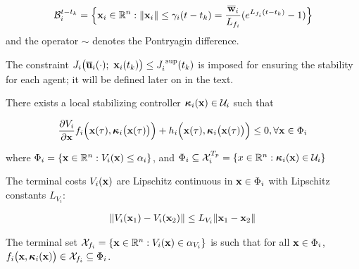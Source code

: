 \begin{align}
  \mathcal{B}_i^{t-t_k} =
  \Big\{\bm{\mathbf{x}}_i \in \mathbb{R}^n : \|\bm{\mathbf{x}}_i\| \leq \gamma_i (t-t_k) = \frac{\overline{\bm{\mathbf{w}}}_i}{L_{f_i}} (e^{L_{f_i} (t-t_k)} - 1) \Big\}
\end{align}
and the operator $\sim$ denotes the Pontryagin difference.

The constraint $J_i \big(\overline{\bm{\mathbf{u}}}_i (\cdot);\ \bm{\mathbf{x}}_i(t_k)\big) \leq J_i^{\text{ sup}}(t_k)$
is imposed for ensuring the stability for each agent; it will be defined later
on in the text.

\begin{gg_box}
\begin{assumption}

  There exists a local stabilizing controller
  $\bm{\mathbf{\kappa}}_i(\bm{\mathbf{x}}) \in \mathcal{U}_i$ such that

  \begin{align}
    \dfrac{\partial V_i}{\partial \bm{\mathbf{x}}} f_i \Big(\bm{\mathbf{x}}(\tau), \bm{\mathbf{\kappa}}_i\big(\bm{\mathbf{x}}(\tau)\big)\Big) +
      h_i\Big(\bm{\mathbf{x}}(\tau), \bm{\mathbf{\kappa}}_i \big(\bm{\mathbf{x}}(\tau)\big)\Big) \leq 0, \forall \bm{\mathbf{x}} \in \Phi_i
  \end{align}

  where $\Phi_i = \{\bm{\mathbf{x}} \in \mathbb{R}^n : V_i(\bm{\mathbf{x}}) \leq \alpha_i \}$, and
  $\Phi_i \subseteq \mathcal{X}_i^{T_p} = \{x \in \mathbb{R}^n : \bm{\mathbf{\kappa}}_i(\bm{\mathbf{x}}) \in \mathcal{U}_i\}$

  \label{ass:local_controller_k}
\end{assumption}
\end{gg_box}


\begin{gg_box}
\begin{assumption}

  The terminal costs $V_i(\bm{\mathbf{x}})$ are Lipschitz continuous in $\bm{\mathbf{x}} \in \Phi_i$
  with Lipschitz constants $L_{V_i}$:

  \begin{align}
    \| V_i(\bm{\mathbf{x}}_1) - V_i(\bm{\mathbf{x}}_2)\| \leq L_{V_i} \|\bm{\mathbf{x}}_1 - \bm{\mathbf{x}}_2 \|
  \end{align}

  \label{ass:V_i_Lipschitz}
\end{assumption}
\end{gg_box}


\begin{gg_box}
\begin{assumption}

  The terminal set $\mathcal{X}_{f_i} = \{ \bm{\mathbf{x}} \in \mathbb{R}^n : V_i(\bm{\mathbf{x}}) \in \alpha_{V_i}\}$
  is such that for all $\bm{\mathbf{x}} \in \Phi_i$, $f_i\big(\bm{\mathbf{x}}, \bm{\mathbf{\kappa}}_i(\bm{\mathbf{x}})\big) \in \mathcal{X}_{f_i} \subseteq \Phi_i$.

  \label{ass:x_f_i}
\end{assumption}
\end{gg_box}
